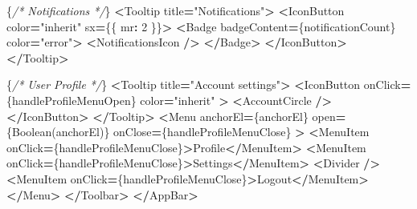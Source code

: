 \documentclass[
]{article}
\newenvironment{Shaded}{\begin{snugshade}}{\end{snugshade}}
\newcommand{\BuiltInTok}[1]{#1}
\newcommand{\CommentTok}[1]{\textcolor[rgb]{0.56,0.35,0.01}{\textit{#1}}}
\newcommand{\DecValTok}[1]{\textcolor[rgb]{0.00,0.00,0.81}{#1}}
\newcommand{\NormalTok}[1]{#1}
\newcommand{\OperatorTok}[1]{\textcolor[rgb]{0.81,0.36,0.00}{\textbf{#1}}}
\newcommand{\StringTok}[1]{\textcolor[rgb]{0.31,0.60,0.02}{#1}}
\begin{document}
\begin{Shaded}
\begin{Highlighting}[]
\NormalTok{            \{}\CommentTok{/* Notifications */}\NormalTok{\}}
            \OperatorTok{\textless{}}\NormalTok{Tooltip title}\OperatorTok{=}\StringTok{"Notifications"}\OperatorTok{\textgreater{}}
              \OperatorTok{\textless{}}\NormalTok{IconButton color}\OperatorTok{=}\StringTok{"inherit"}\NormalTok{ sx}\OperatorTok{=}\NormalTok{\{\{ mr}\OperatorTok{:} \DecValTok{2}\NormalTok{ \}\}}\OperatorTok{\textgreater{}}
                \OperatorTok{\textless{}}\NormalTok{Badge badgeContent}\OperatorTok{=}\NormalTok{\{notificationCount\} color}\OperatorTok{=}\StringTok{"error"}\OperatorTok{\textgreater{}}
                  \OperatorTok{\textless{}}\NormalTok{NotificationsIcon }\OperatorTok{/\textgreater{}}
                \OperatorTok{\textless{}/}\NormalTok{Badge}\OperatorTok{\textgreater{}}
              \OperatorTok{\textless{}/}\NormalTok{IconButton}\OperatorTok{\textgreater{}}
            \OperatorTok{\textless{}/}\NormalTok{Tooltip}\OperatorTok{\textgreater{}}

\NormalTok{            \{}\CommentTok{/* User Profile */}\NormalTok{\}}
            \OperatorTok{\textless{}}\NormalTok{Tooltip title}\OperatorTok{=}\StringTok{"Account settings"}\OperatorTok{\textgreater{}}
              \OperatorTok{\textless{}}\NormalTok{IconButton}
\NormalTok{                onClick}\OperatorTok{=}\NormalTok{\{handleProfileMenuOpen\}}
\NormalTok{                color}\OperatorTok{=}\StringTok{"inherit"}
              \OperatorTok{\textgreater{}}
                \OperatorTok{\textless{}}\NormalTok{AccountCircle }\OperatorTok{/\textgreater{}}
              \OperatorTok{\textless{}/}\NormalTok{IconButton}\OperatorTok{\textgreater{}}
            \OperatorTok{\textless{}/}\NormalTok{Tooltip}\OperatorTok{\textgreater{}}
            \OperatorTok{\textless{}}\NormalTok{Menu}
\NormalTok{              anchorEl}\OperatorTok{=}\NormalTok{\{anchorEl\}}
\NormalTok{              open}\OperatorTok{=}\NormalTok{\{}\BuiltInTok{Boolean}\NormalTok{(anchorEl)\}}
\NormalTok{              onClose}\OperatorTok{=}\NormalTok{\{handleProfileMenuClose\}}
            \OperatorTok{\textgreater{}}
              \OperatorTok{\textless{}}\NormalTok{MenuItem onClick}\OperatorTok{=}\NormalTok{\{handleProfileMenuClose\}}\OperatorTok{\textgreater{}}\NormalTok{Profile}\OperatorTok{\textless{}/}\NormalTok{MenuItem}\OperatorTok{\textgreater{}}
              \OperatorTok{\textless{}}\NormalTok{MenuItem onClick}\OperatorTok{=}\NormalTok{\{handleProfileMenuClose\}}\OperatorTok{\textgreater{}}\NormalTok{Settings}\OperatorTok{\textless{}/}\NormalTok{MenuItem}\OperatorTok{\textgreater{}}
              \OperatorTok{\textless{}}\NormalTok{Divider }\OperatorTok{/\textgreater{}}
              \OperatorTok{\textless{}}\NormalTok{MenuItem onClick}\OperatorTok{=}\NormalTok{\{handleProfileMenuClose\}}\OperatorTok{\textgreater{}}\NormalTok{Logout}\OperatorTok{\textless{}/}\NormalTok{MenuItem}\OperatorTok{\textgreater{}}
            \OperatorTok{\textless{}/}\NormalTok{Menu}\OperatorTok{\textgreater{}}
          \OperatorTok{\textless{}/}\NormalTok{Toolbar}\OperatorTok{\textgreater{}}
        \OperatorTok{\textless{}/}\NormalTok{AppBar}\OperatorTok{\textgreater{}}


\end{Highlighting}
\end{Shaded}
\end{document}
